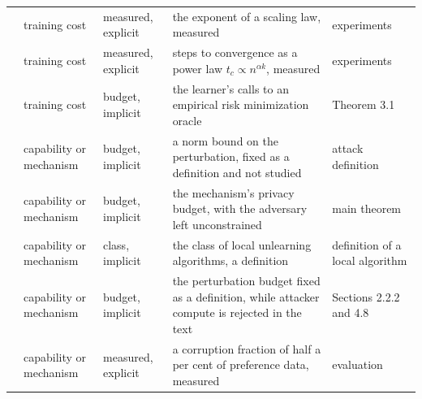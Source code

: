 \begin{table}[t]
\begin{tabular}{@{}lp{3.2cm}p{2.4cm}p{6.6cm}p{2.7cm}@{}}
\cite{BAP25} & training cost & measured, explicit & the exponent of a scaling law, measured & experiments \\
\cite{BEGKMZ22} & training cost & measured, explicit & steps to convergence as a power law $t_c \propto n^{\alpha k}$, measured & experiments \\
\cite{BBHS22} & training cost & budget, implicit & the learner's calls to an empirical risk minimization oracle & Theorem 3.1 \\
\midrule
\cite{CGBSHC22} & capability or mechanism & budget, implicit & a norm bound on the perturbation, fixed as a definition and not studied & attack definition \\
\cite{SAHBS26} & capability or mechanism & budget, implicit & the mechanism's privacy budget, with the adversary left unconstrained & main theorem \\
\cite{YHGA25} & capability or mechanism & class, implicit & the class of local unlearning algorithms, a definition & definition of a local algorithm \\
\cite{CAPBRTGMK19} & capability or mechanism & budget, implicit & the perturbation budget fixed as a definition, while attacker compute is rejected in the text & Sections 2.2.2 and 4.8 \\
\cite{RT24} & capability or mechanism & measured, explicit & a corruption fraction of half a per cent of preference data, measured & evaluation \\
\bottomrule
\end{tabular}
\end{table}
